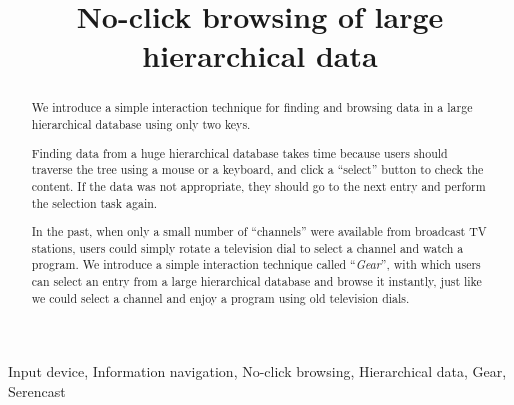 \documentclass[conference]{IEEEtran}
\begin{document}
\title{No-click browsing of large hierarchical data}
%
%

\author{
}

\IEEEoverridecommandlockouts
{}

\maketitle

\IEEEpubidadjcol

\begin{abstract}
We introduce a simple interaction technique for finding and browsing
data in a large hierarchical database using only two keys.

Finding data from a huge hierarchical database takes time
because users should traverse the tree using a mouse or a keyboard,
and click a ``select'' button to check the content.
If the data was not appropriate,
they should go to the next entry and perform the selection task again.

In the past, when only a small number of ``channels'' were available
from broadcast TV stations, users could simply rotate
a television dial to select a channel and watch a program.
We introduce a simple interaction technique called ``\textit{Gear}'',
with which users can select an entry from a large hierarchical database and
browse it instantly, just like we could select a channel and enjoy a program
using old television dials.
\end{abstract}

\begin{IEEEkeywords}
  Input device, Information navigation, No-click browsing,
  Hierarchical data, Gear, Serencast
\end{IEEEkeywords}
\end{document}
